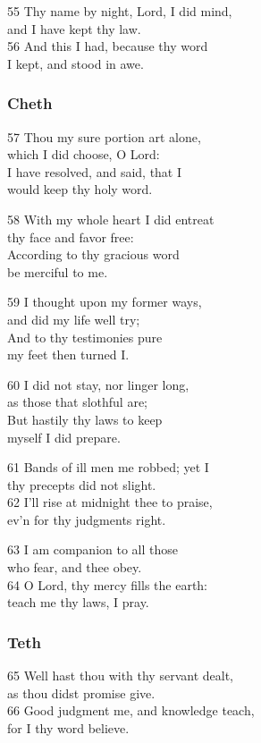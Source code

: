 \begin{multicols}{3}
55 Thy name by night, Lord, I did mind,\\
and I have kept thy law.\\
56 And this I had, because thy word\\
I kept, and stood in awe.

\subsubsection*{Cheth}

57 Thou my sure portion art alone,\\
which I did choose, O Lord:\\
I have resolved, and said, that I\\
would keep thy holy word.

58 With my whole heart I did entreat\\
thy face and favor free:\\
According to thy gracious word\\
be merciful to me.

59 I thought upon my former ways,\\
and did my life well try;\\
And to thy testimonies pure\\
my feet then turned I.

60 I did not stay, nor linger long,\\
as those that slothful are;\\
But hastily thy laws to keep\\
myself I did prepare.

61 Bands of ill men me robbed; yet I\\
thy precepts did not slight.\\
62 I’ll rise at midnight thee to praise,\\
ev’n for thy judgments right.

63 I am companion to all those\\
who fear, and thee obey.\\
64 O Lord, thy mercy fills the earth:\\
teach me thy laws, I pray.

\subsubsection*{Teth}

65 Well hast thou with thy servant dealt,\\
as thou didst promise give.\\
66 Good judgment me, and knowledge teach,\\
for I thy word believe.


\end{multicols}
